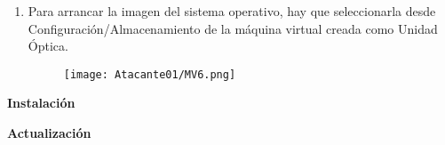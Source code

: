 \begin{enumerate}
\item Para arrancar la imagen del sistema operativo, hay que seleccionarla desde Con\-fi\-gu\-ra\-ción/\-Almacenamiento de la máquina virtual creada como Unidad Óptica.
\begin{figure}[H] %
\begin{center}
\texttt{[image: Atacante01/MV6.png]}
\end{center}
\end{figure}




\end{enumerate}
\textbf{Instalación}

\textbf{Actualización}

